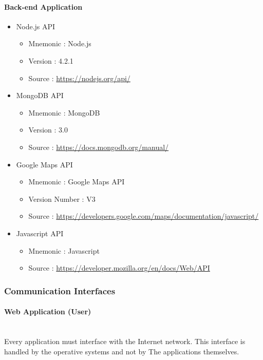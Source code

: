 \documentclass[12pt, a4paper]{article}
\begin{document}
\paragraph{Back-end Application} 

\begin{itemize}
	\item Node.js API
	\begin{itemize}
		\item Mnemonic : Node.js
		\item Version : 4.2.1
		\item Source : \url{https://nodejs.org/api/}
	\end{itemize}

	\item MongoDB API
	\begin{itemize}
		\item Mnemonic : MongoDB
		\item Version : 3.0
		\item Source : \url{https://docs.mongodb.org/manual/}
	\end{itemize}

	\item Google Maps API
	\begin{itemize}
		\item Mnemonic : Google Maps API
		\item Version Number : V3
		\item Source : \url{https://developers.google.com/maps/documentation/javascript/}
	\end{itemize}
	\item Javascript API
	\begin{itemize}
		\item Mnemonic : Javascript
		\item Source : \url{https://developer.mozilla.org/en/docs/Web/API} 
	\end{itemize}
\end{itemize}

\subsubsection{Communication Interfaces} 
\label{ssub:communication_interfaces}
\paragraph{Web Application (User)}\mbox{} \\
Every application must interface with the Internet network. This interface is handled by the operative systems and not by The applications themselves.
\end{document}
